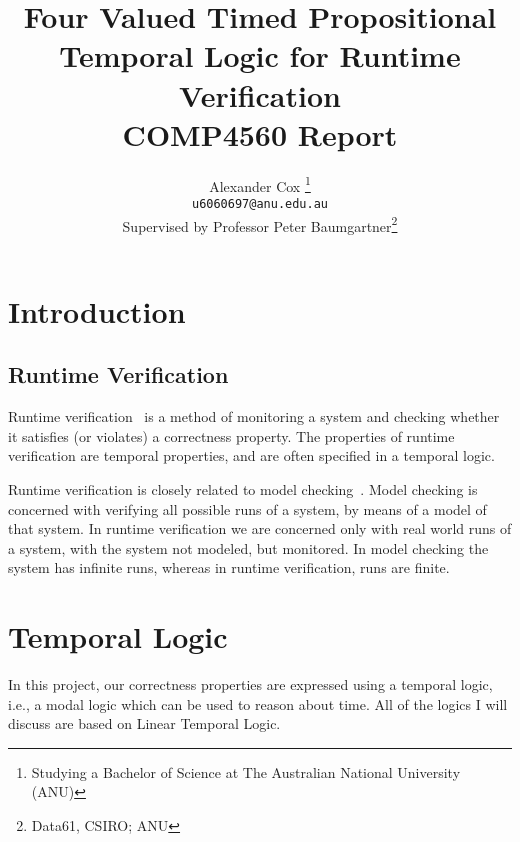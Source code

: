 \documentclass[a4paper]{article}
\title{
  Four Valued Timed Propositional Temporal Logic for Runtime Verification\\
  \normalsize{} COMP4560 Report
}
\author{
  Alexander Cox
  \thanks{Studying a Bachelor of Science at The Australian National University (ANU)}\\
  \small\texttt{u6060697@anu.edu.au}\\
  \normalsize{}Supervised by Professor Peter Baumgartner\thanks{Data61, CSIRO\@; ANU}
}
\begin{document}
\maketitle

\begin{abstract}
\end{abstract}
\newpage
\tableofcontents

\section{Introduction}
\subsection{Runtime Verification}
Runtime verification~\autocite{colin2005rv} is a method of monitoring a system and checking whether it satisfies (or violates) a correctness property.
The properties of runtime verification are temporal properties, and are often specified in a temporal logic. %

Runtime verification is closely related to model checking~\autocite{baier2008principles}. Model checking is concerned with verifying all possible runs of a system, by means of a model of that system. In runtime verification we are concerned only with real world runs of a system, with the system not modeled, but monitored. In model checking the system has infinite runs, whereas in runtime verification, runs are finite.


\section{Temporal Logic}
In this project, our correctness properties are expressed using a temporal logic, i.e., a modal logic which can be used to reason about time. All of the logics I will discuss are based on Linear Temporal Logic.

\end{document}
